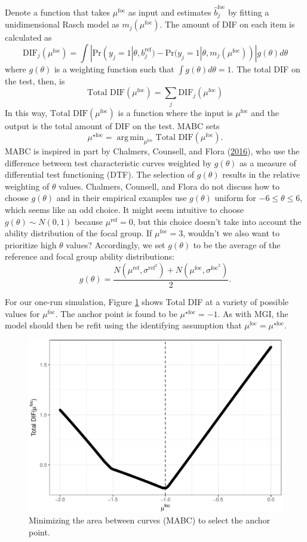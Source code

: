\documentclass[
  11pt,
]{article}
\begin{document}
Denote a function that takes \(\mu^\text{foc}\) as input and estimates \(\hat b_j^\text{foc}\) by fitting a unidimensional Rasch model as \(m_j(\mu^\text{foc})\). The amount of DIF on each item is calculated as
\[
\text{DIF}_j(\mu^\text{foc}) = \int |\text{Pr}(y_j = 1| \theta, b_j^{\text{ref}}) - \text{Pr}(y_j = 1| \theta, m_j(\mu^\text{foc}))| g(\theta)d\theta
\]
where \(g(\theta)\) is a weighting function such that \(\int g(\theta)d\theta = 1\). The total DIF on the test, then, is
\[
\text{Total DIF}(\mu^\text{foc}) = \sum_{j} \text{DIF}_j(\mu^\text{foc})
\]
In this way, \(\text{Total DIF}(\mu^\text{foc})\) is a function where the input is \(\mu^\text{foc}\) and the output is the total amount of DIF on the test. MABC sets
\[
\mu^{\star\text{foc}} = \mathop\mathrm{arg\,min}_{\mu^\text{foc}} \text{Total DIF}(\mu^\text{foc}).
\]
MABC is inspired in part by Chalmers, Counsell, and Flora (\protect\hyperlink{ref-chalmers2016might}{2016}), who use the difference between test characteristic curves weighted by \(g(\theta)\) as a measure of differential test functioning (DTF). The selection of \(g(\theta)\) results in the relative weighting of \(\theta\) values. Chalmers, Counsell, and Flora do not discuss how to choose \(g(\theta)\) and in their empirical examples use \(g(\theta)\) uniform for \(-6 \le \theta \le 6\), which seems like an odd choice. It might seem intuitive to choose \(g(\theta) \sim N(0, 1)\) because \(\mu^\text{ref} = 0\), but this choice doesn't take into account the ability distribution of the focal group. If \(\mu^\text{foc} = 3\), wouldn't we also want to prioritize high \(\theta\) values? Accordingly, we set \(g(\theta)\) to be the average of the reference and focal group ability distributions:
\[
g(\theta) = \dfrac{N(\mu^{\text{ref}}, \sigma^{\text{ref}^2}) + N(\mu^{\text{foc}}, \sigma^{\text{foc}^2})}{2}.
\]

For our one-run simulation, Figure \ref{fig:mabc} shows Total DIF at a variety of possible values for \(\mu^\text{foc}\). The anchor point is found to be \(\mu^{\star\text{foc}} = -1\). As with MGI, the model should then be refit using the identifying assumption that \(\mu^{\text{foc}} = \mu^{\star\text{foc}}\).

\begin{figure}[H]

{\centering \includegraphics[width=0.7\linewidth]{paper_files/figure-latex/mabc-1} 

}

\caption{Minimizing the area between curves (MABC) to select the anchor point.}\label{fig:mabc}
\end{figure}
\end{document}
